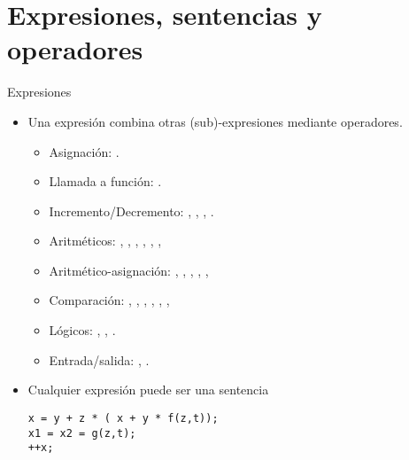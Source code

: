 \section{Expresiones, sentencias y operadores}

\begin{frame}[fragile]{Expresiones}
\begin{itemize}
  \item Una expresión combina otras (sub)-expresiones mediante operadores.
    \begin{itemize}
      \item Asignación: .
      \item Llamada a función: .
      \item Incremento/Decremento: , , , .
      \item Aritméticos: 
        ,
        ,
        ,
        ,
        ,
        ,
      \item Aritmético-asignación:
        ,
        ,
        ,
        ,
        ,
      \item Comparación:
        ,
        ,
        ,
        ,
        ,
        ,
      \item Lógicos:
        ,
        ,
        .
      \item Entrada/salida:
        , .
    \end{itemize}
  \item Cualquier expresión puede ser una sentencia
\begin{lstlisting}
x = y + z * ( x + y * f(z,t));
x1 = x2 = g(z,t);
++x;
\end{lstlisting}
\end{itemize}
\end{frame}

